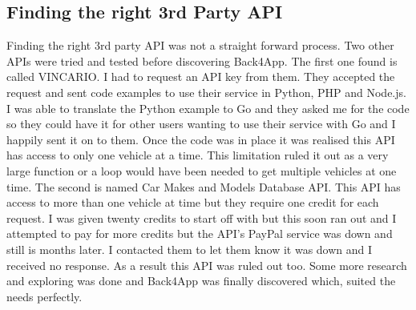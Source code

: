 \subsection{Finding the right 3rd Party API}
Finding the right 3rd party API was not a straight forward process. Two other APIs were tried and tested before discovering Back4App. The first one found is called VINCARIO. I had to request an API key from them. They accepted the request and sent code examples to use their service in Python, PHP and Node.js. I was able to translate the Python example to Go and they asked me for the code so they could have it for other users wanting to use their service with Go and I happily sent it on to them. Once the code was in place it was realised this API has access to only one vehicle at a time. This limitation ruled it out as a very large function or a loop would have been needed to get multiple vehicles at one time. The second is named Car Makes and Models Database API. This API has access to more than one vehicle at time but they require one credit for each request. I was given twenty credits to start off with but this soon ran out and I attempted to pay for more credits but the API's PayPal service was down and still is months later. I contacted them to let them know it was down and I received no response. As a result this API was ruled out too. Some more research and exploring was done and Back4App was finally discovered which, suited the needs perfectly. 


